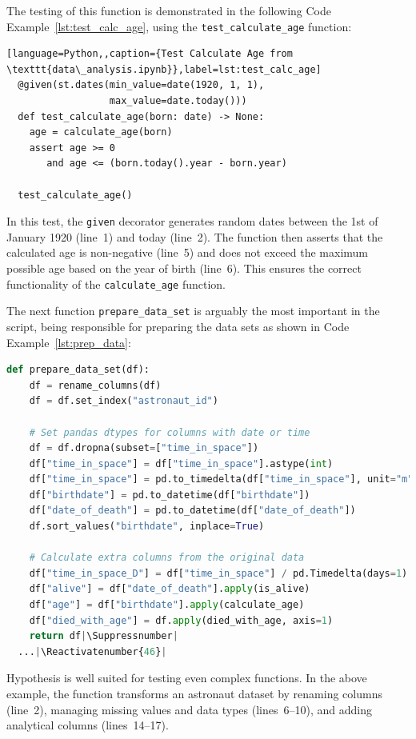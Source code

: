 \documentclass[runningheads]{llncs}
\makeatletter
\let\origthelstnumber\thelstnumber
\newcommand*\Suppressnumber{%
  \lst@AddToHook{OnNewLine}{%
    \let\thelstnumber\relax%
     \advance\c@lstnumber-\@ne\relax%
    }%
}
\newcommand*\Reactivatenumber[1]{%
  \setcounter{lstnumber}{\numexpr#1-1\relax}
  \lst@AddToHook{OnNewLine}{%
   \let\thelstnumber\origthelstnumber%
   \refstepcounter{lstnumber}%
  }%
}
\makeatother
\begin{document}
The testing of this function is demonstrated in the following Code Example~\ref{lst:test_calc_age}, using the \texttt{test\_calculate\_age} function:

\begin{lstlisting}[language=Python,,caption={Test Calculate Age from \texttt{data\_analysis.ipynb}},label=lst:test_calc_age]
  @given(st.dates(min_value=date(1920, 1, 1), 
                  max_value=date.today()))
  def test_calculate_age(born: date) -> None:
    age = calculate_age(born)
    assert age >= 0
       and age <= (born.today().year - born.year)
  
  test_calculate_age()
\end{lstlisting}
In this test, the \texttt{given} decorator generates random dates between the 1st of January 1920 (line~1) and today (line~2). The function then asserts that the calculated age is non-negative (line~5) and does not exceed the maximum possible age based on the year of birth (line~6). This ensures the correct functionality of the \texttt{calculate\_age} function.

\vspace{5mm}
\noindent The next function \texttt{prepare\_data\_set} is arguably the most important in the script, being responsible for preparing the data sets as shown in Code Example~\ref{lst:prep_data}:

\begin{lstlisting}[language=Python,caption={Prepare Data Set from \texttt{data\_analysis.ipynb}},label=lst:prep_data]
  def prepare_data_set(df):
    df = rename_columns(df)
    df = df.set_index("astronaut_id")

    # Set pandas dtypes for columns with date or time
    df = df.dropna(subset=["time_in_space"])
    df["time_in_space"] = df["time_in_space"].astype(int)
    df["time_in_space"] = pd.to_timedelta(df["time_in_space"], unit="m")
    df["birthdate"] = pd.to_datetime(df["birthdate"])
    df["date_of_death"] = pd.to_datetime(df["date_of_death"])
    df.sort_values("birthdate", inplace=True)

    # Calculate extra columns from the original data
    df["time_in_space_D"] = df["time_in_space"] / pd.Timedelta(days=1)
    df["alive"] = df["date_of_death"].apply(is_alive)
    df["age"] = df["birthdate"].apply(calculate_age)
    df["died_with_age"] = df.apply(died_with_age, axis=1)
    return df|\Suppressnumber|
  ...|\Reactivatenumber{46}|

\end{lstlisting}
Hypothesis is well suited for testing even complex functions. In the above example, the function transforms an astronaut dataset by renaming columns (line~2), managing missing values and data types (lines~6--10), and adding analytical columns (lines~14--17).
\end{document}
